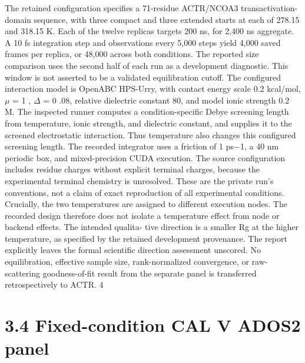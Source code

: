 \documentclass[11pt]{article}
\begin{document}
The retained configuration specifies a 71-residue ACTR/NCOA3 transactivation-domain sequence,
with three compact and three extended starts at each of 278.15 and 318.15 K. Each of the twelve
replicas targets 200 ns, for 2,400 ns aggregate. A 10 fs integration step and observations every 5,000
steps yield 4,000 saved frames per replica, or 48,000 across both conditions. The reported size
comparison uses the second half of each run as a development diagnostic. This window is not
asserted to be a validated equilibration cutoff.
The configured interaction model is OpenABC HPS-Urry, with contact energy scale 0.2 kcal/mol,
\ensuremath{\mu} = 1 , \ensuremath{\Delta} = 0 .08, relative dielectric constant 80, and model ionic strength 0.2 M. The inspected
runner computes a condition-specific Debye screening length from temperature, ionic strength, and
dielectric constant, and supplies it to the screened electrostatic interaction. Thus temperature
also changes this configured screening length. The recorded integrator uses a friction of 1 ps\ensuremath{-}1,
a 40 nm periodic box, and mixed-precision CUDA execution. The source configuration includes
residue charges without explicit terminal charges, because the experimental terminal chemistry
is unresolved. These are the private run’s conventions, not a claim of exact reproduction of all
experimental conditions.
Crucially, the two temperatures are assigned to different execution nodes. The recorded design
therefore does not isolate a temperature effect from node or backend effects. The intended qualita-
tive direction is a smaller Rg at the higher temperature, as specified by the retained development
provenance. The report explicitly leaves the formal scientific direction assessment unscored. No
equilibration, effective sample size, rank-normalized convergence, or raw-scattering goodness-of-fit
result from the separate panel is transferred retrospectively to ACTR.
4


\section*{3.4 Fixed-condition CAL V ADOS2 panel}
\end{document}
